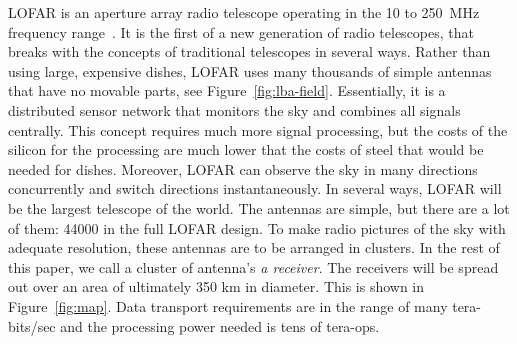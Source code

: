 \documentclass{article}
\begin{document}
LOFAR is an aperture array radio telescope operating in the
10 to 250~MHz frequency range~\cite{deVos:09}.  It is the first of a new generation of
radio telescopes, that breaks with the concepts of traditional
telescopes in several ways.  Rather than using large, expensive
dishes, LOFAR uses many thousands of simple antennas that have no
movable parts, see
Figure~\ref{fig:lba-field}.  Essentially, it is a distributed sensor
network that monitors the sky and combines all signals centrally.
This concept requires much more signal processing, but the 
costs of the silicon for the processing are much lower that the costs of steel that would
be needed for dishes. Moreover, LOFAR can observe the sky in many
directions concurrently and switch directions instantaneously.  In
several ways, LOFAR will be the largest telescope of the world.
The antennas are simple, but there are a lot of them: 44000 in the full LOFAR
design. To make radio pictures of the sky with adequate resolution,
these antennas are to be arranged in clusters.
In the rest of this paper, we call a cluster of antenna's \emph{a receiver}.
The receivers will be spread out over
an area of ultimately 350 km in diameter. This is shown in Figure~\ref{fig:map}.
Data transport requirements are in the range of many
tera-bits/sec and the processing power needed is tens of tera-ops.
\end{document}
